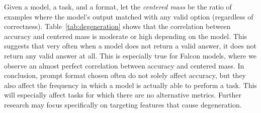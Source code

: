 \documentclass{article} %
\begin{document}
Given a model, a task, and a format, let the \textit{centered mass} be the ratio of examples where the model's output matched with any valid option (regardless of correctness). Table~\ref{tab:degeneration} shows that the correlation between accuracy and centered mass is moderate or high depending on the model. This suggests that very often when a model does not return a valid answer, it does not return any valid answer at all. This is especially true for Falcon models, where we observe an almost perfect correlation between accuracy and centered mass. In conclusion, prompt format chosen often do not solely affect accuracy, but they also affect the frequency in which a model is actually able to perform a task. This will especially affect tasks for which there are no alternative metrics. Further research may focus specifically on targeting features that cause degeneration.
\end{document}
